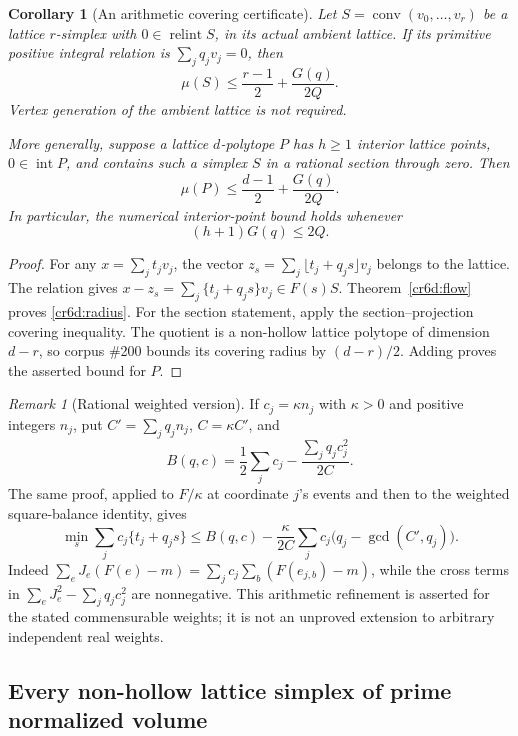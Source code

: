 \documentclass[11pt,a4paper]{article}
\newtheorem{corollary}[theorem]{Corollary}
\theoremstyle{remark}\newtheorem{remark}[theorem]{Remark}
\begin{document}
\begin{corollary}[An arithmetic covering certificate]\label{cr6d:simplex}
Let $S=\operatorname{conv}(v_0,\ldots,v_r)$ be a lattice
$r$-simplex with $0\in\operatorname{relint}S$, in its actual
ambient lattice.  If its primitive positive integral relation is
$\sum_jq_jv_j=0$, then
\begin{equation}\label{cr6d:radius}
 \mu(S)\le\frac{r-1}{2}+\frac{G(q)}{2Q}.
\end{equation}
Vertex generation of the ambient lattice is not required.

More generally, suppose a lattice $d$-polytope $P$ has $h\ge1$
interior lattice points, $0\in\operatorname{int}P$, and contains
such a simplex $S$ in a rational section through zero.  Then
\[
 \mu(P)\le\frac{d-1}{2}+\frac{G(q)}{2Q}.
\]
In particular, the numerical interior-point bound holds whenever
\begin{equation}\label{cr6d:criterion}
 (h+1)G(q)\le2Q.
\end{equation}
\end{corollary}
\begin{proof}
For any $x=\sum_jt_jv_j$, the vector
$z_s=\sum_j\lfloor t_j+q_js\rfloor v_j$ belongs to the lattice.
The relation gives
$x-z_s=\sum_j\{t_j+q_js\}v_j\in F(s)S$.
Theorem~\ref{cr6d:flow} proves \eqref{cr6d:radius}.
For the section statement, apply the section--projection
covering inequality.  The quotient is a non-hollow lattice
polytope of dimension $d-r$, so corpus \#200 bounds its covering
radius by $(d-r)/2$.  Adding proves the asserted bound for $P$.
\end{proof}

\begin{remark}[Rational weighted version]\label{cr6d:weighted}
If $c_j=\kappa n_j$ with $\kappa>0$ and positive integers $n_j$,
put $C'=\sum_jq_jn_j$, $C=\kappa C'$, and
\[
 B(q,c)=\frac12\sum_jc_j-\frac{\sum_jq_jc_j^2}{2C}.
 \]
The same proof, applied to $F/\kappa$ at coordinate $j$'s
events and then to the weighted square-balance identity, gives
\[
 \min_s\sum_jc_j\{t_j+q_js\}
 \le B(q,c)
 -\frac{\kappa}{2C}
   \sum_jc_j\bigl(q_j-\gcd(C',q_j)\bigr).
\]
Indeed $\sum_eJ_e(F(e)-m)=
\sum_jc_j\sum_b(F(e_{j,b})-m)$, while the cross terms in
$\sum_eJ_e^2-\sum_jq_jc_j^2$ are nonnegative.
This arithmetic refinement is asserted for the stated
commensurable weights; it is not an unproved extension to
arbitrary independent real weights.
\end{remark}

\subsection{Every non-hollow lattice simplex of prime normalized volume}
\end{document}
